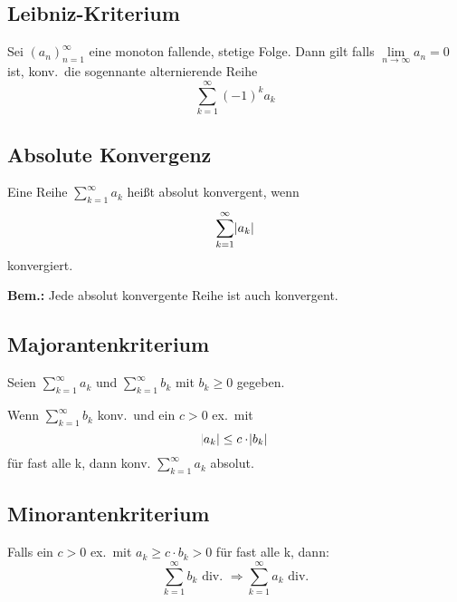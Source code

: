 \documentclass[10pt]{article}
\newcommand{\an}{{(a_n)}_{n=1}^\infty}
\begin{document}
    \subsection{Leibniz-Kriterium}
    Sei $\an$ eine monoton fallende, stetige Folge. Dann gilt falls
    $\lim\limits_{n \rightarrow \infty} a_n = 0$ ist, konv.\ die sogennante
    alternierende Reihe
    \begin{equation*}
        \sum_{k=1}^\infty {(-1)}^k a_k
    \end{equation*}


    \subsection{Absolute Konvergenz}
    Eine Reihe $\sum_{k=1}^\infty a_k$ heißt absolut konvergent, wenn
    \begin{equation*}
        \sum_{k=1}^\infty \abs{a_k}
    \end{equation*}
    konvergiert.

    \textbf{Bem.:} Jede absolut konvergente Reihe ist auch konvergent.

    \subsection{Majorantenkriterium}
    Seien $\sum_{k=1}^\infty a_k$ und $\sum_{k=1}^\infty b_k$ mit $b_k \geq 0$
    gegeben.

    Wenn $\sum_{k=1}^\infty b_k$ konv.\ und ein $c>0$ ex.\ mit
    $$\abs{a_k} \leq c \cdot \abs{b_k}$$ für fast alle k, dann konv.
    $\sum_{k=1}^\infty a_k$ absolut.

    \subsection{Minorantenkriterium}
    Falls ein $c > 0$ ex.\ mit $a_k \geq c \cdot b_k > 0$ für fast alle k,
    dann:
    \begin{equation*}
        \sum_{k=1}^\infty b_k \text{ div. }
        \Rightarrow \sum_{k=1}^\infty a_k \text{ div.}
    \end{equation*}
\end{document}
